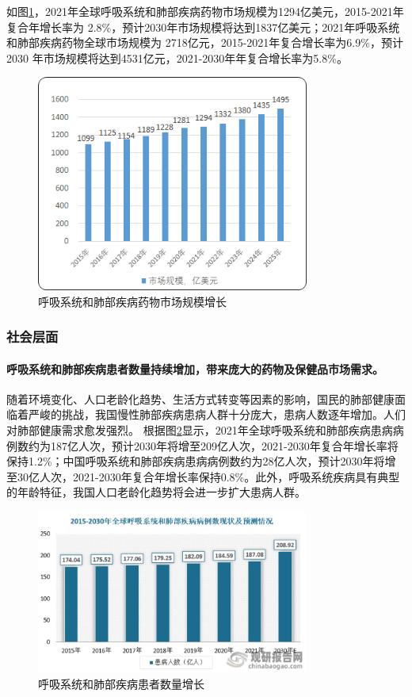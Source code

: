 \documentclass[12pt]{ctexart}
\begin{document}
如图\ref{fig:market_growth}，2021年全球呼吸系统和肺部疾病药物市场规模为1294亿美元，2015-2021年复合年增长率为 2.8\%，预计2030年市场规模将达到1837亿美元；2021年呼吸系统和肺部疾病药物全球市场规模为 2718亿元，2015-2021年复合增长率为6.9\%，预计2030 年市场规模将达到4531亿元，2021-2030年年复合增长率为5.8\%。

\begin{figure}[H]
    \centering
    \includegraphics[width=0.8\textwidth]{./fig/市场.png}
    \caption{呼吸系统和肺部疾病药物市场规模增长}
    \label{fig:market_growth}
\end{figure}
\subsubsection{社会层面}
\paragraph{呼吸系统和肺部疾病患者数量持续增加，带来庞大的药物及保健品市场需求。}

随着环境变化、人口老龄化趋势、生活方式转变等因素的影响，国民的肺部健康面临着严峻的挑战，我国慢性肺部疾病患病人群十分庞大，患病人数逐年增加。人们对肺部健康需求愈发强烈。
根据图\ref{fig:patient_growth}显示\autocite{data}，2021年全球呼吸系统和肺部疾病患病病例数约为187亿人次，预计2030年将增至209亿人次，2021-2030年复合年增长率将保持1.2\%；中国呼吸系统和肺部疾病患病病例数约为28亿人次，预计2030年将增至30亿人次，2021-2030年复合年增长率保持0.8\%。此外，呼吸系统疾病具有典型的年龄特征，我国人口老龄化趋势将会进一步扩大患病人群。
\begin{figure}[H]
    \centering
    \includegraphics[width=0.8\textwidth]{./fig/病例数.png}
    \caption{呼吸系统和肺部疾病患者数量增长}
    \label{fig:patient_growth}
\end{figure}
\end{document}
